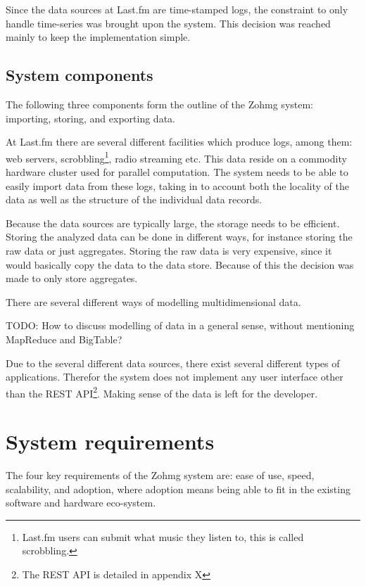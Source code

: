 Since the data sources at Last.fm are time-stamped logs, the constraint to only
handle time-series was brought upon the system. This decision was reached
mainly to keep the implementation simple.


\subsection*{System components}

The following three components form the outline of the Zohmg system: importing,
storing, and exporting data.

At Last.fm there are several different facilities which produce logs, among
them: web servers, scrobbling\footnote{Last.fm users can submit what music they
listen to, this is called scrobbling.}, radio streaming etc. This data reside
on a commodity hardware cluster used for parallel computation. The system needs to
be able to easily import data from these logs, taking in to account both the
locality of the data as well as the structure of the individual data records.

Because the data sources are typically large, the storage needs to be efficient.
Storing the analyzed data can be done in different ways, for instance storing
the raw data or just aggregates. Storing the raw data is very expensive, since
it would basically copy the data to the data store. Because of this the decision
was made to only store aggregates.

There are several different ways of modelling multidimensional data.

TODO: How to discuss modelling of data in a general sense, without mentioning
MapReduce and BigTable?

Due to the several different data sources, there exist several
different types of applications. Therefor the system does not implement any user
interface other than the REST API\footnote{The REST API is detailed in appendix
X}. Making sense of the data is left for the developer.


\section{System requirements}


The four key requirements of the Zohmg system are: ease of use, speed,
scalability, and adoption, where adoption means being able to fit in the
existing software and hardware eco-system.

